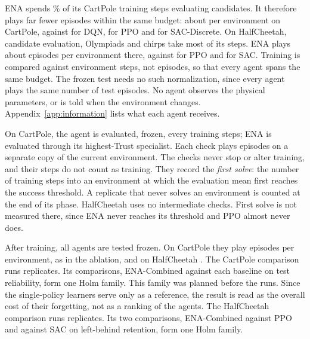 ENA spends \% of its CartPole training steps evaluating candidates. It therefore plays far fewer episodes within the same budget: about  per environment on CartPole, against  for DQN,  for PPO and  for SAC-Discrete. On HalfCheetah, candidate evaluation, Olympiads and chirps take most of its steps. ENA plays about  episodes per environment there, against  for PPO and  for SAC. Training is compared against environment steps, not episodes, so that every agent spans the same budget. The frozen test needs no such normalization, since every agent plays the same number of test episodes. No agent observes the physical parameters, or is told when the environment changes. Appendix~\ref{app:information} lists what each agent receives.

On CartPole, the agent is evaluated, frozen, every  training steps; ENA is evaluated through its highest-Trust specialist. Each check plays  episodes on a separate copy of the current environment. The checks never stop or alter training, and their steps do not count as training. They record the \textit{first solve}: the number of training steps into an environment at which the evaluation mean first reaches the success threshold. A replicate that never solves an environment is counted at the end of its phase. HalfCheetah uses no intermediate checks. First solve is not measured there, since ENA never reaches its threshold and PPO almost never does.

After training, all agents are tested frozen. On CartPole they play  episodes per environment, as in the ablation, and on HalfCheetah . The CartPole comparison runs  replicates. Its  comparisons, ENA-Combined against each baseline on test reliability, form one Holm family. This family was planned before the runs. Since the single-policy learners serve only as a reference, the result is read as the overall cost of their forgetting, not as a ranking of the agents. The HalfCheetah comparison runs  replicates. Its two comparisons, ENA-Combined against PPO and against SAC on left-behind retention, form one Holm family.

